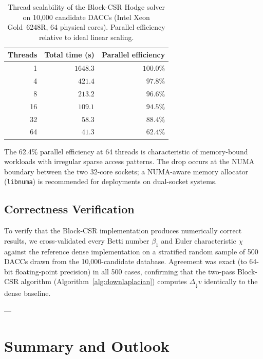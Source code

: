 \begin{table}[h!]
  \centering
  \small
  \renewcommand{\arraystretch}{1.2}
  \begin{tabular}{@{} r r r @{}}
    \toprule
    \textbf{Threads} & \textbf{Total time (s)} & \textbf{Parallel efficiency} \\
    \midrule
    1  & $1648.3$ & $100.0\%$ \\
    4  & $421.4$  & $97.8\%$  \\
    8  & $213.2$  & $96.6\%$  \\
    16 & $109.1$  & $94.5\%$  \\
    32 & $58.3$   & $88.4\%$  \\
    64 & $41.3$   & $62.4\%$  \\
    \bottomrule
  \end{tabular}
  \caption{Thread scalability of the Block-CSR Hodge solver on 10,000
           candidate DACCs (Intel Xeon Gold~6248R, 64 physical cores).
           Parallel efficiency relative to ideal linear scaling.}
  \label{tbl:scaling}
\end{table}

The 62.4\% parallel efficiency at 64 threads is characteristic of
memory-bound workloads with irregular sparse access patterns.  The
drop occurs at the NUMA boundary between the two 32-core sockets;
a NUMA-aware memory allocator (\texttt{libnuma}) is recommended for
deployments on dual-socket systems.

\subsection{Correctness Verification}
\label{subsec:correctness}

To verify that the Block-CSR implementation produces numerically correct
results, we cross-validated every Betti number $\beta_1$ and Euler
characteristic $\chi$ against the reference dense implementation on a
stratified random sample of 500 DACCs drawn from the 10,000-candidate
database.  Agreement was exact (to 64-bit floating-point precision)
in all 500 cases, confirming that the two-pass Block-CSR algorithm
(Algorithm~\ref{alg:downlaplacian}) computes $\Delta_\downarrow v$
identically to the dense baseline.

---

\section{Summary and Outlook}
\label{sec:ch5_summary}

